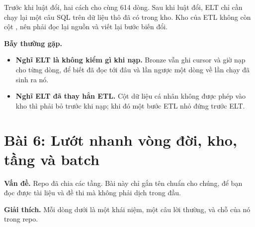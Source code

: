 Trước khi luật đổi, hai cách cho cùng 614 dòng. Sau khi luật đổi, ELT chỉ cần chạy lại một câu SQL trên dữ liệu thô đã có trong kho. Kho của ETL không còn cột , nên phải đọc lại nguồn và viết lại bước biến đổi.

\begin{luuy}
\textbf{Bẫy thường gặp.}
\begin{itemize}
  \item \textbf{Nghĩ ELT là không kiểm gì khi nạp.} Bronze vẫn ghi cursor và giờ nạp cho từng dòng, để biết đã đọc tới đâu và lần ngược một dòng về lần chạy đã sinh ra nó.
  \item \textbf{Nghĩ ELT đã thay hẳn ETL.} Cột dữ liệu cá nhân không được phép vào kho thì phải bỏ trước khi nạp; khi đó một bước ETL nhỏ đứng trước ELT.
\end{itemize}
\end{luuy}

\section{Bài 6: Lướt nhanh vòng đời, kho, tầng và batch}

\textbf{Vấn đề.} Repo  đã chia các tầng. Bài này chỉ gắn tên chuẩn cho chúng, để bạn đọc được tài liệu và đề thi mà không phải dịch trong đầu.

\textbf{Giải thích.} Mỗi dòng dưới là một khái niệm, một câu lời thường, và chỗ của nó trong repo.

